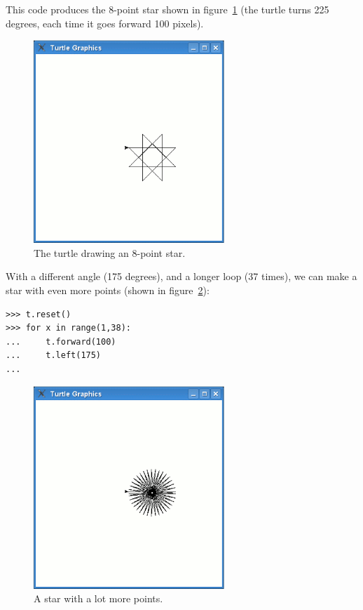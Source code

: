 This code produces the 8-point star shown in figure~\ref{fig20} (the turtle turns 225 degrees, each time it goes forward 100 pixels).

\begin{figure}
\begin{center}
\includegraphics[width=72mm]{eps/figure20.eps}
\end{center}
\caption{The turtle drawing an 8-point star.}\label{fig20}
\end{figure}

\noindent
With a different angle (175 degrees), and a longer loop (37 times), we can make a star with even more points (shown in figure~\ref{fig21}):

\begin{listing}
\begin{verbatim}
>>> t.reset()
>>> for x in range(1,38):
...     t.forward(100)
...     t.left(175)
...
\end{verbatim}
\end{listing}

\begin{figure}
\begin{center}
\includegraphics[width=72mm]{eps/figure21.eps}
\end{center}
\caption{A star with a lot more points.}\label{fig21}
\end{figure}

